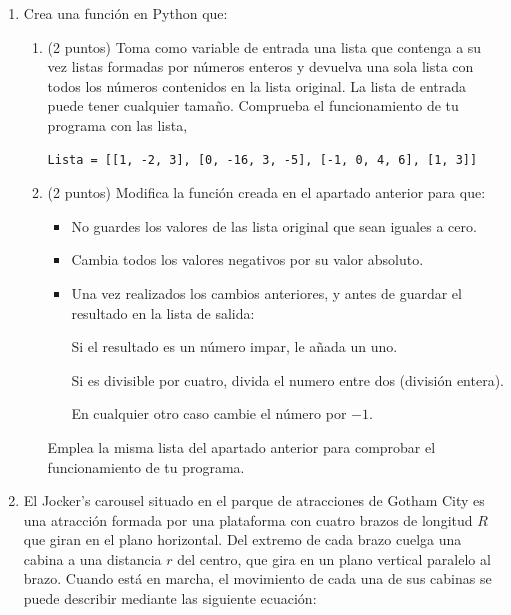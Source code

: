 \begin{enumerate}
	\item Crea una función en Python que:
	
	
	
	
	\begin{enumerate}
		\item \label{apt1} (2 puntos) Toma como variable de entrada una lista que contenga a su vez listas formadas por números enteros y devuelva una sola lista con todos los números contenidos en la lista original. La lista de entrada puede tener cualquier tamaño. Comprueba el funcionamiento de tu programa con las lista,
		\begin{verbatim}
Lista = [[1, -2, 3], [0, -16, 3, -5], [-1, 0, 4, 6], [1, 3]]
		\end{verbatim}
		
		
		\item (2 puntos) Modifica la función creada en el apartado anterior para que:
		\begin{itemize}
			\item No guardes los valores de las lista original que sean iguales a cero.
			\item Cambia todos los valores negativos por su valor absoluto.
			\item Una vez realizados los cambios anteriores, y antes de guardar el resultado en la lista de salida: 
			
			Si el resultado es un número impar, le añada un uno. 
			
			Si es divisible por cuatro, divida el numero entre dos (división entera). 
			
			En cualquier otro caso cambie el número por $-1$.  
		\end{itemize}
		Emplea la misma lista del apartado anterior para comprobar el funcionamiento de tu programa.
	\end{enumerate}
	
	\item El Jocker's carousel  situado en el parque de atracciones de Gotham City es una atracción formada por una plataforma con cuatro brazos de longitud $R$ que giran en el plano horizontal. Del extremo de cada brazo cuelga una cabina a una distancia $r$ del centro, que gira en un plano vertical paralelo al brazo. Cuando está en marcha, el movimiento de cada una de sus cabinas se puede describir mediante las siguiente ecuación:
	

\end{enumerate}
